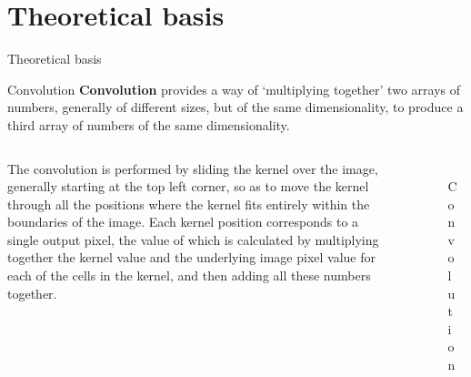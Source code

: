 \section{Theoretical basis}

\begin{frame}{Theoretical basis}
    \begin{block}{Convolution }
      \textbf{Convolution} provides a way of `multiplying together' two arrays of numbers, generally of different sizes, but of the same dimensionality, to produce a third array of numbers of the same dimensionality\autocite{mlcb}.
    \end{block}
    \begin{columns}
      \begin{column}{0.5\textwidth}
        The convolution is performed by sliding the kernel over the image, generally starting at the top left corner, so as to move the kernel through all the positions where the kernel fits entirely within the boundaries of the image. Each kernel position corresponds to a single output pixel, the value of which is calculated by multiplying together the kernel value and the underlying image pixel value for each of the cells in the kernel, and then adding all these numbers together.
      \end{column}
      \begin{column}{0.5\textwidth}
        \begin{figure}
          \includegraphics[width=\textwidth]{figure/conv2d.png}
          \caption{Convolution}
        \end{figure}
      \end{column}
    \end{columns}
\end{frame}

